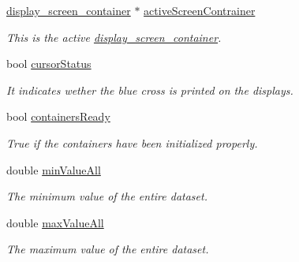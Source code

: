 \begin{DoxyCompactItemize}
\mbox{\hyperlink{classdisplay__screen__container}{display\+\_\+screen\+\_\+container}} $\ast$ \mbox{\hyperlink{classScreen__manager_ac1552176fcb2eec1f3f71139933b38b6}{active\+Screen\+Contrainer}}
\begin{DoxyCompactList}\small\item\em This is the active \mbox{\hyperlink{classdisplay__screen__container}{display\+\_\+screen\+\_\+container}}. \end{DoxyCompactList}\item 
\mbox{\label{classScreen__manager_a9aa51b589844972991a3b234ccf17aa4}} 
bool \mbox{\hyperlink{classScreen__manager_a9aa51b589844972991a3b234ccf17aa4}{cursor\+Status}}
\begin{DoxyCompactList}\small\item\em It indicates wether the blue cross is printed on the displays. \end{DoxyCompactList}\item 
\mbox{\label{classScreen__manager_ad88254b68805043118c3fb66009bad6b}} 
bool \mbox{\hyperlink{classScreen__manager_ad88254b68805043118c3fb66009bad6b}{containers\+Ready}}
\begin{DoxyCompactList}\small\item\em True if the containers have been initialized properly. \end{DoxyCompactList}\item 
\mbox{\label{classScreen__manager_a65684948bf1429005ea9f1a507d50e49}} 
double \mbox{\hyperlink{classScreen__manager_a65684948bf1429005ea9f1a507d50e49}{min\+Value\+All}}
\begin{DoxyCompactList}\small\item\em The minimum value of the entire dataset. \end{DoxyCompactList}\item 
\mbox{\label{classScreen__manager_a8d46413c932ecafedb06fd9b0ee1d6b1}} 
double \mbox{\hyperlink{classScreen__manager_a8d46413c932ecafedb06fd9b0ee1d6b1}{max\+Value\+All}}
\begin{DoxyCompactList}\small\item\em The maximum value of the entire dataset. \end{DoxyCompactList}\end{DoxyCompactItemize}



